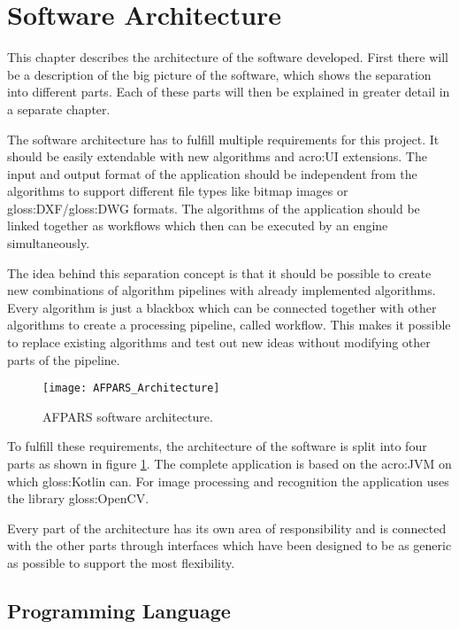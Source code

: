 \section{Software Architecture}
This chapter describes the architecture of the software developed. First there will be a description of the big picture of the software, which shows the separation into different parts. Each of these parts will then be explained in greater detail in a separate chapter.

The software architecture has to fulfill multiple requirements for this project. It should be easily extendable with new algorithms and \acrshort{acro:UI} extensions. The input and output format of the application should be independent from the algorithms to support different file types like bitmap images or \gls{gloss:DXF}/\gls{gloss:DWG} formats. The algorithms of the application should be linked together as workflows which then can be executed by an engine simultaneously.

The idea behind this separation concept is that it should be possible to create new combinations of algorithm pipelines with already implemented algorithms. Every algorithm is just a blackbox which can be connected together with other algorithms to create a processing pipeline, called workflow. This makes it possible to replace existing algorithms and test out new ideas without modifying other parts of the pipeline. 

\begin{figure}[h]
  \centering
      \texttt{[image: AFPARS\_Architecture]}
  \caption{AFPARS software architecture.}
  \label{fig:AFPARS_Architecture}
\end{figure}


To fulfill these requirements, the architecture of the software is split into four parts as shown in figure \ref{fig:AFPARS_Architecture}. The complete application is based on the \acrfull{acro:JVM} on which \gls{gloss:Kotlin} can. For image processing and recognition the application uses the library \gls{gloss:OpenCV}.

Every part of the architecture has its own area of responsibility and is connected with the other parts through interfaces which have been designed to be as generic as possible to support the most flexibility.

\subsection{Programming Language}

